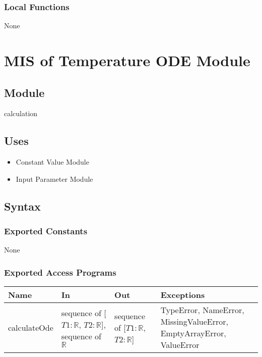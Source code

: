 \documentclass[12pt, titlepage]{article}
\begin{document}
\subsubsection{Local Functions}

None


\newpage
\section{MIS of Temperature ODE Module} \label{Temperature_ODEs_Module} 

\subsection{Module}

calculation

\subsection{Uses}

\begin{itemize}
    \item Constant Value Module 
    \item Input Parameter Module
\end{itemize}

\subsection{Syntax}

\subsubsection{Exported Constants}
None

\subsubsection{Exported Access Programs}

\begin{tabular}{p{3cm} p{5cm} p{4cm} p{2.5cm}}
\hline
\textbf{Name} & \textbf{In} & \textbf{Out} & \textbf{Exceptions} \\
\hline
calculateOde & sequence of [$T1: \mathbb{R}$, $T2: \mathbb{R}$], sequence of $\mathbb{R}$ & sequence of [$T1: \mathbb{R}$, $T2: \mathbb{R}$] & TypeError, NameError, MissingValueError, EmptyArrayError, ValueError \\
\hline
\end{tabular}
\end{document}
